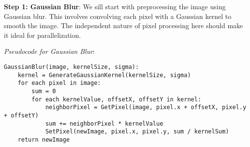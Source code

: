 \documentclass[12pt]{article}
\theoremstyle{definition}
\theoremstyle{plain}
\begin{document}
\begin{description}
\item \textbf{Step 1: Gaussian Blur}: We sill start with preprocessing the image 
using Gaussian blur. This involves convolving each pixel with a Gaussian kernel to
smooth the image. The independent nature of pixel processing here should make it 
ideal for parallelization. 

\textit{Pseudocode for Gaussian Blur}:
\begin{lstlisting}
GaussianBlur(image, kernelSize, sigma):
    kernel = GenerateGaussianKernel(kernelSize, sigma)
    for each pixel in image:
        sum = 0
        for each kernelValue, offsetX, offsetY in kernel:
            neighborPixel = GetPixel(image, pixel.x + offsetX, pixel.y + offsetY)
            sum += neighborPixel * kernelValue
            SetPixel(newImage, pixel.x, pixel.y, sum / kernelSum)
    return newImage
\end{lstlisting}


\end{description}
\end{document}
